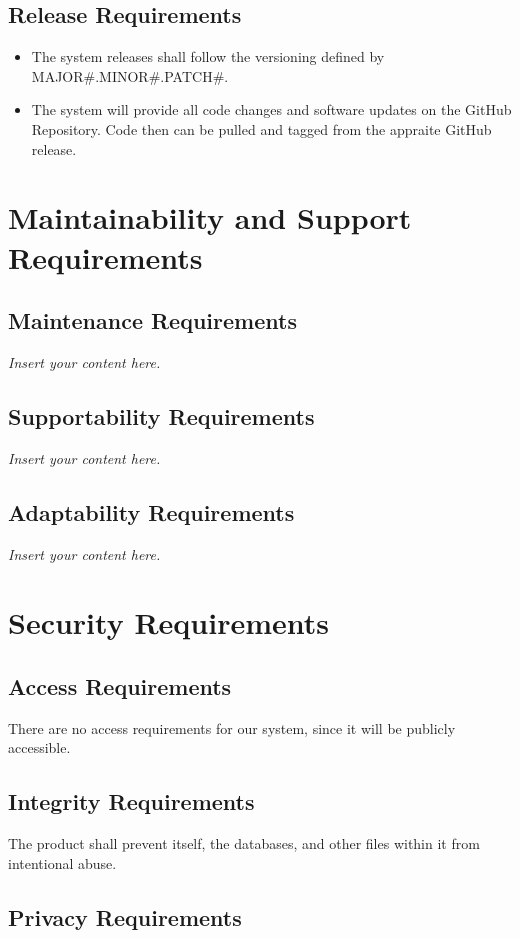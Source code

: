 \documentclass[12pt]{article}
\newcommand{\lips}{\textit{Insert your content here.}}
\begin{document}
\subsection{Release Requirements}
\begin{itemize}
    \item The system releases shall follow the versioning defined by MAJOR\#.MINOR\#.PATCH\#.
    \item The system will provide all code changes and software updates on the GitHub Repository. Code then can be pulled and tagged from the appraite GitHub release.
\end{itemize}


\section{Maintainability and Support Requirements}
\subsection{Maintenance Requirements}
\lips
\subsection{Supportability Requirements}
\lips
\subsection{Adaptability Requirements}
\lips

\section{Security Requirements}
\subsection{Access Requirements}

\par{There are no access requirements for our system, since it will be publicly accessible.}

\subsection{Integrity Requirements}

\par{The product shall prevent itself, the databases, and other files within it from intentional abuse.}

\subsection{Privacy Requirements}
\end{document}
